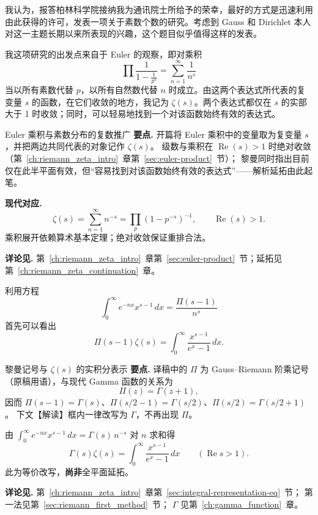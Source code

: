 我认为，报答柏林科学院接纳我为通讯院士所给予的荣幸，最好的方式是迅速利用由此获得的许可，发表一项关于素数个数的研究。考虑到 Gauss 和 Dirichlet 本人对这一主题长期以来所表现的兴趣，这个题目似乎值得这样的发表。

我这项研究的出发点来自于 Euler 的观察，即对乘积
\[
\prod \frac{1}{1-\frac{1}{p^s}} = \sum_{n=1}^{\infty} \frac{1}{n^s}
\]
当以所有素数代替 $p$，以所有自然数代替 $n$ 时成立。由这两个表达式所代表的复变量 $s$ 的函数，在它们收敛的地方，我记为 $\zeta(s)$。两个表达式都仅在 $s$ 的实部大于 1 时收敛；同时，可以轻易地找到一个对该函数始终有效的表达式。

\begin{commentary}{Euler 乘积与素数分布的复数推广}
\textbf{要点.}
开篇将 Euler 乘积中的变量取为复变量 $s$，并把两边共同代表的对象记作 $\zeta(s)$。
级数与乘积在 $\operatorname{Re}(s)>1$ 时绝对收敛（第~\ref{ch:riemann_zeta_intro}~章第~\ref{sec:euler-product}~节）；
黎曼同时指出目前仅在此半平面有效，但“容易找到对该函数始终有效的表达式”——解析延拓由此起笔。

\textbf{现代对应.}
\[
\zeta(s)=\sum_{n=1}^\infty n^{-s}=\prod_p(1-p^{-s})^{-1},\qquad \operatorname{Re}(s)>1.
\]
乘积展开依赖算术基本定理；绝对收敛保证重排合法。

\textbf{详论见.}
第~\ref{ch:riemann_zeta_intro}~章第~\ref{sec:euler-product}~节；延拓见第~\ref{ch:riemann_zeta_continuation}~章。
\end{commentary}

利用方程
\[
\int_0^{\infty} e^{-nx} x^{s-1} \, dx = \frac{\Pi(s-1)}{n^s}
\]
首先可以看出
\[
\Pi(s-1)\zeta(s) = \int_0^{\infty} \frac{x^{s-1}}{e^x - 1} \, dx.
\]

\begin{commentary}{黎曼记号与 $\zeta(s)$ 的实积分表示}
\textbf{要点.}
译稿中的 $\Pi$ 为 Gauss--Riemann 阶乘记号（原稿用语），与现代 Gamma 函数的关系为
\[
\Pi(z)=\Gamma(z+1),
\]
因而 $\Pi(s-1)=\Gamma(s)$、$\Pi(s/2-1)=\Gamma(s/2)$、$\Pi(s/2)=\Gamma(s/2+1)$。
下文【解读】框内一律改写为 $\Gamma$，不再出现 $\Pi$。

由 $\int_0^\infty e^{-nx}x^{s-1}\,dx=\Gamma(s)\,n^{-s}$ 对 $n$ 求和得
\[
\Gamma(s)\zeta(s)=\int_0^\infty\frac{x^{s-1}}{e^x-1}\,dx
\qquad(\operatorname{Re}s>1).
\]
此为等价改写，\textbf{尚非}全平面延拓。

\textbf{详论见.}
第~\ref{ch:riemann_zeta_intro}~章第~\ref{sec:integral-representation-eq}~节；
第一法见第~\ref{sec:riemann_first_method}~节；
$\Gamma$ 见第~\ref{ch:gamma_function}~章。
\end{commentary}


